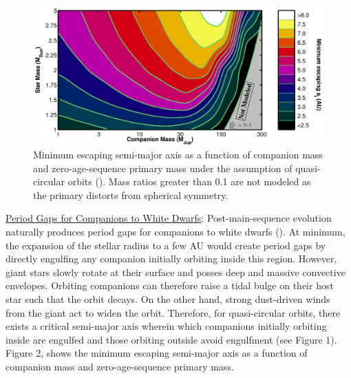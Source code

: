 \documentclass{iau_FM}
\begin{document}
\begin{figure}[b]
\begin{center}
 \includegraphics[width=5.4in]{results_fig.png} 
 \caption{Minimum escaping semi-major axis as a function of companion mass and zero-age-sequence primary mass under the assumption of quasi-circular orbits (\cite{NS2013}).  Mass ratios greater than 0.1 are not modeled as the primary distorts from spherical symmetry.}
   \label{fig2}
\end{center}
\end{figure}

{\sc\underline{Period Gaps for Companions to White Dwarfs}}: Post-main-sequence evolution naturally produces period gaps for companions to white dwarfs (\cite{2010MNRAS.408..631N,NS2013}).  At minimum, the expansion of the stellar radius to a few AU would create period gaps by directly engulfing any companion initially orbiting inside this region.  However, giant stars slowly rotate at their surface and posses deep and massive convective envelopes.  Orbiting companions can therefore raise a tidal bulge on their host star such that the orbit decays.  On the other hand, strong dust-driven winds from the giant act to widen the orbit.  Therefore, for quasi-circular orbits, there exists a critical semi-major axis wherein which companions initially orbiting inside are engulfed and those orbiting outside avoid engulfment (see Figure 1).  Figure 2, shows the minimum escaping semi-major axis as a function of companion mass and zero-age-sequence primary mass.
\end{document}
